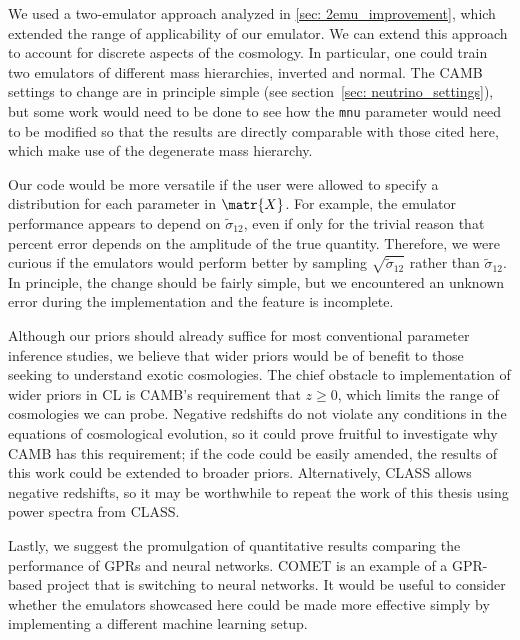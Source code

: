 We used a two-emulator approach analyzed in \ref{sec: 2emu_improvement},
which extended the range of applicability of our emulator. We can extend this
approach to account for discrete aspects of the cosmology. In particular, 
one could train two emulators of different mass hierarchies, inverted and
normal. The CAMB settings to change are in principle simple (see
section~\ref{sec: neutrino_settings}), but some work would need to be done to
see how the \texttt{mnu} parameter would need to be modified so that the
results are directly comparable with those cited here, which make use of the
degenerate mass hierarchy.

Our code would be more versatile if the user were allowed to specify a
distribution for each parameter in $\matr{X}$. For example, the emulator
performance appears to depend on $\tilde{\sigma}_{12}$,
even if only for the trivial
reason that percent error depends on the amplitude of the true quantity.
Therefore, we were curious if the emulators would perform better by
sampling $\sqrt{\tilde{\sigma}_{12}}$ rather than $\tilde{\sigma}_{12}$.
In principle, the change should be fairly simple, but we encountered an
unknown error during the implementation and the feature is incomplete.




Although our priors should already suffice for most conventional parameter
inference studies, we believe that wider priors would be of benefit to those
seeking to understand exotic cosmologies. The chief obstacle to 
implementation of wider priors in CL is CAMB's requirement that $z \geq 0$,
which limits the range of cosmologies we can probe. 
Negative redshifts do not violate any conditions in the equations of
cosmological evolution, so it could prove fruitful to investigate why CAMB 
has this requirement; if the code could be easily amended, the results of
this work could be extended to broader priors. Alternatively,
CLASS allows negative redshifts, so it may be worthwhile 
to repeat the work of this thesis using power spectra from CLASS.


Lastly, we suggest the promulgation of quantitative results comparing the
performance of GPRs and neural networks. COMET is an example of a GPR-based
project that is switching to neural networks. It would be useful to consider
whether the emulators showcased here could be made more effective simply by
implementing a different machine learning setup. 

